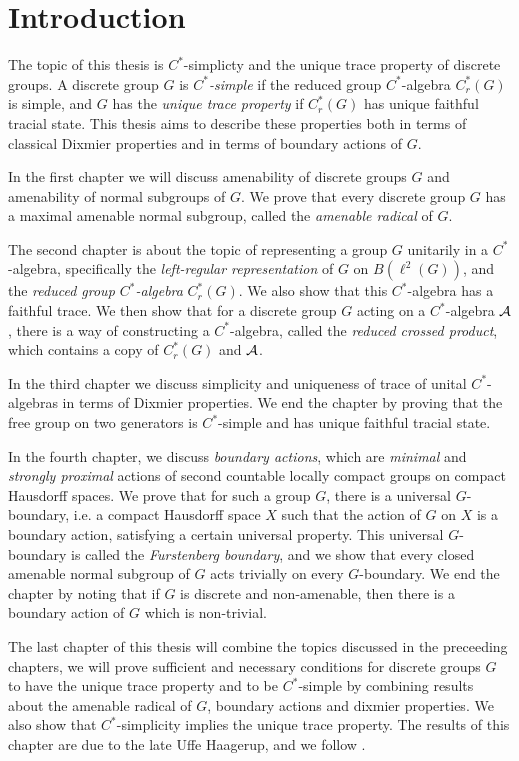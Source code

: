 \chapter*{Introduction}
The topic of this thesis is $C^*$-simplicty and the unique trace property of discrete groups. A discrete group $G$ is \textit{$C^*$-simple} if the reduced group $C^*$-algebra $C_r^*(G)$ is simple, and $G$ has the \textit{unique trace property} if $C_r^*(G)$ has unique faithful tracial state. This thesis aims to describe these properties both in terms of classical Dixmier properties and in terms of boundary actions of $G$.

In the first chapter we will discuss amenability of discrete groups $G$ and amenability of normal subgroups of $G$. We prove that every discrete group $G$ has a maximal amenable normal subgroup, called the \emph{amenable radical} of $G$. 

The second chapter is about the topic of representing a group $G$ unitarily in a $C^*$-algebra, specifically the \textit{left-regular representation} of $G$ on $B(\ell^2(G))$, and the \textit{reduced group $C^*$-algebra} $C_r^*(G)$. We also show that this $C^*$-algebra has a faithful trace. We then show that for a discrete group $G$ acting on a $C^*$-algebra $\mathcal{A}$, there is a way of constructing a $C^*$-algebra, called the \textit{reduced crossed product}, which contains a copy of $C_r^*(G)$ and $\mathcal{A}$.

In the third chapter we discuss simplicity and uniqueness of trace of unital $C^*$-algebras in terms of Dixmier properties. We end the chapter by proving that the free group on two generators is $C^*$-simple and has unique faithful tracial state.

In the fourth chapter, we discuss \textit{boundary actions}, which are \textit{minimal} and \textit{strongly proximal} actions of second countable locally compact groups on compact Hausdorff spaces. We prove that for such a group $G$, there is a universal $G$-boundary, i.e. a compact Hausdorff space $X$ such that the action of $G$ on $X$ is a boundary action, satisfying a certain universal property. This universal $G$-boundary is called the \textit{Furstenberg boundary}, and we show that every closed amenable normal subgroup of $G$ acts trivially on every $G$-boundary. We end the chapter by noting that if $G$ is discrete and non-amenable, then there is a boundary action of $G$ which is non-trivial.

The last chapter of this thesis will combine the topics discussed in the preceeding chapters, we will prove sufficient and necessary conditions for discrete groups $G$ to have the unique trace property and to be $C^*$-simple by combining results about the amenable radical of $G$, boundary actions and dixmier properties. We also show that $C^*$-simplicity implies the unique trace property. The results of this chapter are due to the late Uffe Haagerup, and we follow \cite{haagerup2015new}.
